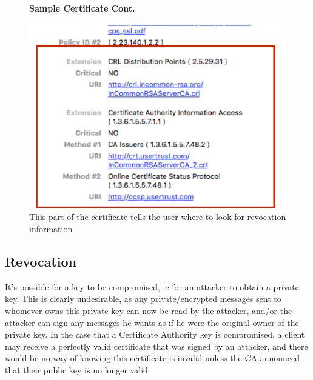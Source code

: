 \documentclass[11pt]{article} %
\begin{document}
{\begin{figure}[H]
    \centering
    \textbf{Sample Certificate Cont.}\par\medskip
    \includegraphics[scale=.5]{./cert2.png}
    \caption{This part of the certificate tells the user where to look for revocation information}
\end{figure}


\subsection{Revocation}
It's possible for a key to be compromised, ie for an attacker to obtain a private key. This is clearly undesirable, as any private/encrypted messages sent to whomever owns this private key can now be read by the attacker, and/or the attacker can sign any messages he wants as if he were the original owner of the private key. In the case that a Certificate Authority key is compromised, a client may receive a perfectly valid certificate that was signed by an attacker, and there would be no way of knowing this certificate is invalid unless the CA announced that their public key is no longer valid.

}
\end{document}
